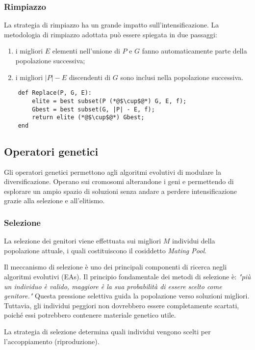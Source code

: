 \subsubsection{Rimpiazzo}
La strategia di rimpiazzo ha un grande impatto sull'intensificazione. La metodologia di rimpiazzo adottata può essere spiegata in due passaggi: 
\begin{enumerate}
    \item i migliori $E$ elementi nell'unione di $P$ e $G$ fanno automaticamente parte della popolazione successiva;
    \item i migliori $|P| - E$ discendenti di $G$ sono inclusi nella popolazione successiva.
\end{enumerate}

\begin{lstlisting}
    def Replace(P, G, E):
        elite = best subset(P (*@$\cup$@*) G, E, f);
        Gbest = best subset(G, |P| - E, f);
        return elite (*@$\cup$@*) Gbest;
    end
\end{lstlisting}

\subsection{Operatori genetici} \hypertarget{og}{}

Gli operatori genetici permettono agli algoritmi evolutivi di modulare la diversificazione. Operano sui cromosomi alterandone i geni e permettendo di esplorare un ampio spazio di soluzioni senza andare a perdere intensificazione grazie alla selezione e all'elitismo.

\subsubsection{Selezione}

La selezione dei genitori viene effettuata sui migliori \( M \) individui della popolazione attuale, i quali costituiscono il cosiddetto \emph{Mating Pool}.

Il meccanismo di selezione è uno dei principali componenti di ricerca negli algoritmi evolutivi (EAs). Il principio fondamentale dei metodi di selezione è: \emph{"più un individuo è valido, maggiore è la sua probabilità di essere scelto come genitore."} Questa pressione selettiva guida la popolazione verso soluzioni migliori. Tuttavia, gli individui peggiori non dovrebbero essere completamente scartati, poiché essi potrebbero contenere materiale genetico utile.

La strategia di selezione determina quali individui vengono scelti per l'accoppiamento (riproduzione).

